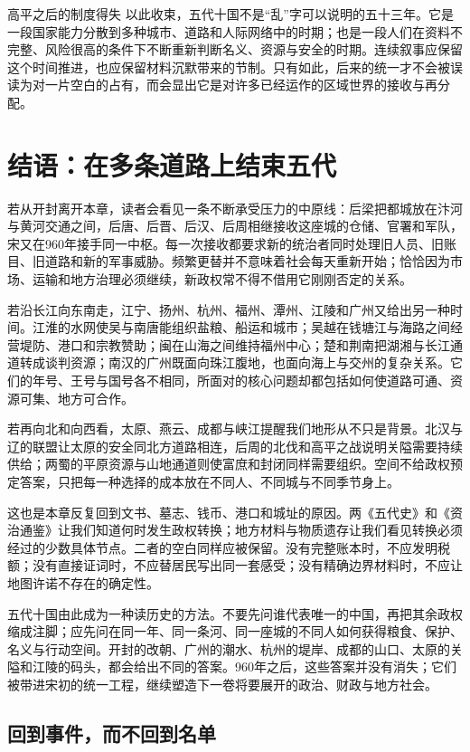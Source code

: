 \begin{causalchain}{高平之后的制度得失}
以此收束，五代十国不是“乱”字可以说明的五十三年。它是一段国家能力分散到多种城市、道路和人际网络中的时期；也是一段人们在资料不完整、风险很高的条件下不断重新判断名义、资源与安全的时期。连续叙事应保留这个时间推进，也应保留材料沉默带来的节制。只有如此，后来的统一才不会被误读为对一片空白的占有，而会显出它是对许多已经运作的区域世界的接收与再分配。

\section{结语：在多条道路上结束五代}

若从开封离开本章，读者会看见一条不断承受压力的中原线：后梁把都城放在汴河与黄河交通之间，后唐、后晋、后汉、后周相继接收这座城的仓储、官署和军队，宋又在960年接手同一中枢。每一次接收都要求新的统治者同时处理旧人员、旧账目、旧道路和新的军事威胁。频繁更替并不意味着社会每天重新开始；恰恰因为市场、运输和地方治理必须继续，新政权常不得不借用它刚刚否定的关系。

若沿长江向东南走，江宁、扬州、杭州、福州、潭州、江陵和广州又给出另一种时间。江淮的水网使吴与南唐能组织盐粮、船运和城市；吴越在钱塘江与海路之间经营堤防、港口和宗教赞助；闽在山海之间维持福州中心；楚和荆南把湖湘与长江通道转成谈判资源；南汉的广州既面向珠江腹地，也面向海上与交州的复杂关系。它们的年号、王号与国号各不相同，所面对的核心问题却都包括如何使道路可通、资源可集、地方可合作。

若再向北和向西看，太原、燕云、成都与峡江提醒我们地形从不只是背景。北汉与辽的联盟让太原的安全同北方道路相连，后周的北伐和高平之战说明关隘需要持续供给；两蜀的平原资源与山地通道则使富庶和封闭同样需要组织。空间不给政权预定答案，只把每一种选择的成本放在不同人、不同城与不同季节身上。

这也是本章反复回到文书、墓志、钱币、港口和城址的原因。两《五代史》和《资治通鉴》让我们知道何时发生政权转换；地方材料与物质遗存让我们看见转换必须经过的少数具体节点。二者的空白同样应被保留。没有完整账本时，不应发明税额；没有直接证词时，不应替居民写出同一套感受；没有精确边界材料时，不应让地图许诺不存在的确定性。

五代十国由此成为一种读历史的方法。不要先问谁代表唯一的中国，再把其余政权缩成注脚；应先问在同一年、同一条河、同一座城的不同人如何获得粮食、保护、名义与行动空间。开封的改朝、广州的潮水、杭州的堤岸、成都的山口、太原的关隘和江陵的码头，都会给出不同的答案。960年之后，这些答案并没有消失；它们被带进宋初的统一工程，继续塑造下一卷将要展开的政治、财政与地方社会。

\subsection{回到事件，而不回到名单}


\end{causalchain}
